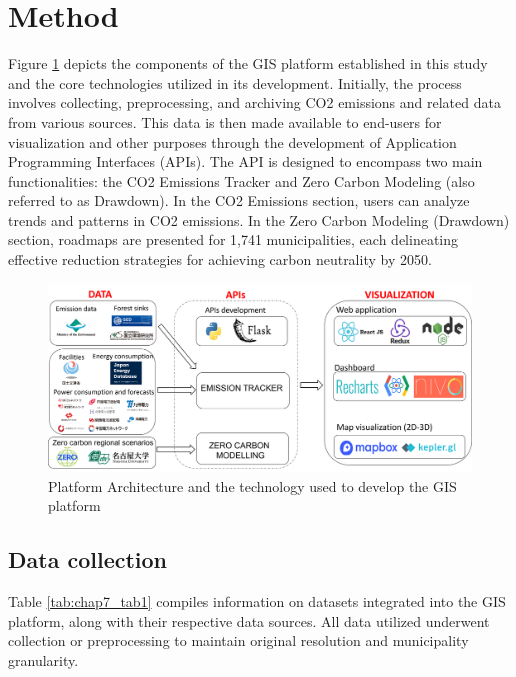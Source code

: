 \section{Method}
Figure \ref{fig:chap7_fig1} depicts the components of the GIS platform established in this study and the core technologies utilized in its development. Initially, the process involves collecting, preprocessing, and archiving CO2 emissions and related data from various sources. This data is then made available to end-users for visualization and other purposes through the development of Application Programming Interfaces (APIs). The API is designed to encompass two main functionalities: the CO2 Emissions Tracker and Zero Carbon Modeling (also referred to as Drawdown). In the CO2 Emissions section, users can analyze trends and patterns in CO2 emissions. In the Zero Carbon Modeling (Drawdown) section, roadmaps are presented for 1,741 municipalities, each delineating effective reduction strategies for achieving carbon neutrality by 2050.\par
\begin{figure}
  \centering
  \includegraphics[width=\textwidth]{figs/chap7/platform_architecture.png}
  \caption[Platform architecture]{Platform Architecture and the technology used to develop the GIS platform}
  \label{fig:chap7_fig1}
\end{figure}

\subsection{Data collection}
Table \ref{tab:chap7_tab1} compiles information on datasets integrated into the GIS platform, along with their respective data sources. All data utilized underwent collection or preprocessing to maintain original resolution and municipality granularity. \par

